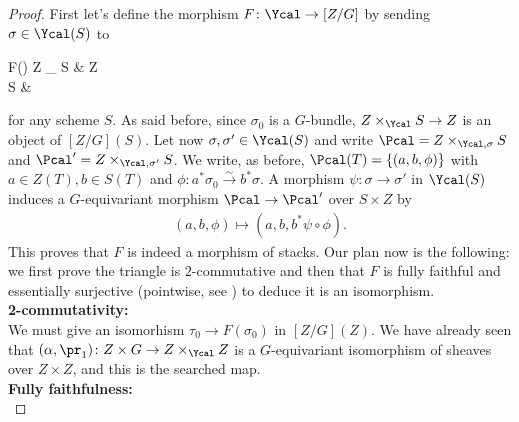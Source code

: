             \begin{proof}
                First let's define the morphism $F\colon \Ycal \to [Z/G]$ by sending $\sigma \in \Ycal(S)$ to 
                \begin{diag}
                    F(\sigma) \coloneqq Z \times_{\Ycal} S \ar[d] \ar[r] & Z \ar[d, "\sigma_0"] \\ 
                    S \ar[r, "\sigma"] & \Ycal
                \end{diag}
                for any scheme $S$. As said before, since $\sigma_0$ is a $G$-bundle, $Z \times_{\Ycal} S \to Z$ is an object of $[Z/G](S)$.
                Let now $\sigma, \sigma' \in \Ycal(S)$ and write $\Pcal = Z \times_{\Ycal, \sigma} S$ and $\Pcal' = Z \times_{\Ycal, \sigma'} S$. We write, as before, $\Pcal(T) = \{(a, b, \phi)\}$ with $a \in Z(T), b \in S(T)$ and $\phi\colon a^*\sigma_0 \stackrel{\sim}{\to} b^*\sigma$. A morphism $\psi\colon \sigma \to \sigma'$ in $\Ycal(S)$ induces a $G$-equivariant morphism $\Pcal \to \Pcal'$ over $S \times Z$ by 
                \begin{gather}
                    \label{eqn:wang_2_1_8_1}
                    (a, b, \phi) \mapsto (a, b, b^*\psi \circ \phi). 
                \end{gather}
                This proves that $F$ is indeed a morphism of stacks.
                Our plan now is the following: we first prove the triangle is $2$-commutative and then that $F$ is fully faithful and essentially surjective (pointwise, see \cite[3.5.2]{Vist:desc}) to deduce it is an isomorphism.\\
                \textbf{2-commutativity:}\\
                We must give an isomorhism $\tau_0 \to F(\sigma_0)$ in $[Z/G](Z)$. We have already seen that $(\alpha, \pr_1)\colon Z \times G \to Z \times_{\Ycal} Z$ is a $G$-equivariant isomorphism of sheaves over $Z \times Z$, and this is the searched map.\\
                \textbf{Fully faithfulness:}\\

\end{proof}
